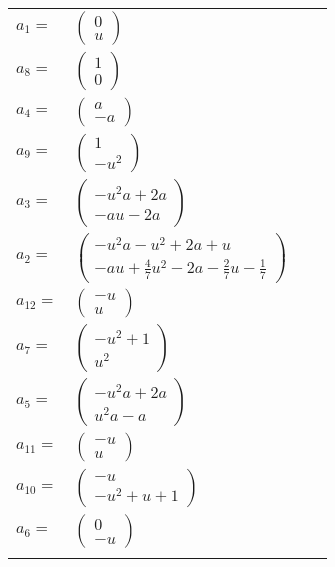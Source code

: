 \documentclass[1p]{elsarticle_modified}
\theoremstyle{definition}
\begin{document}
\begin{tabular}{m{7pt} m{180pt} m{7pt} m{180pt} }
\flushright $a_{1}=$&$\begin{pmatrix}0\\u\end{pmatrix}$ \\
\flushright $a_{8}=$&$\begin{pmatrix}1\\0\end{pmatrix}$ \\
\flushright $a_{4}=$&$\begin{pmatrix}a\\- a\end{pmatrix}$ \\
\flushright $a_{9}=$&$\begin{pmatrix}1\\- u^2\end{pmatrix}$ \\
\flushright $a_{3}=$&$\begin{pmatrix}- u^2 a+2 a\\- a u-2 a\end{pmatrix}$ \\
\flushright $a_{2}=$&$\begin{pmatrix}- u^2 a- u^2+2 a+u\\- a u+\frac{4}{7} u^2-2 a-\frac{2}{7} u-\frac{1}{7}\end{pmatrix}$ \\
\flushright $a_{12}=$&$\begin{pmatrix}- u\\u\end{pmatrix}$ \\
\flushright $a_{7}=$&$\begin{pmatrix}- u^2+1\\u^2\end{pmatrix}$ \\
\flushright $a_{5}=$&$\begin{pmatrix}- u^2 a+2 a\\u^2 a- a\end{pmatrix}$ \\
\flushright $a_{11}=$&$\begin{pmatrix}- u\\u\end{pmatrix}$ \\
\flushright $a_{10}=$&$\begin{pmatrix}- u\\- u^2+u+1\end{pmatrix}$ \\
\flushright $a_{6}=$&$\begin{pmatrix}0\\- u\end{pmatrix}$\\&\end{tabular}
\end{document}
